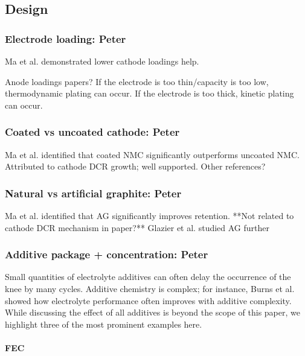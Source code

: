 \documentclass{article}
\begin{document}
\subsection{Design}

\subsubsection{Electrode loading: Peter}

Ma et al.\cite{ma_editors_2019} demonstrated lower cathode loadings help.

Anode loadings papers?
If the electrode is too thin/capacity is too low, thermodynamic plating can occur.
If the electrode is too thick, kinetic plating can occur.

\subsubsection{Coated vs uncoated cathode: Peter}

Ma et al.\cite{ma_editors_2019} identified that coated NMC significantly outperforms uncoated NMC.
Attributed to cathode DCR growth; well supported.
Other references?

\subsubsection{Natural vs artificial graphite: Peter}

Ma et al.\cite{ma_editors_2019} identified that AG significantly improves retention.
**Not related to cathode DCR mechanism in paper?**
Glazier et al. studied AG further

\subsubsection{Additive package + concentration: Peter}

Small quantities of electrolyte additives can often delay the occurrence of the knee by many cycles. Additive chemistry is complex; for instance, Burns et al.\cite{burns_predicting_2013} showed how electrolyte performance often improves with additive complexity. While discussing the effect of all additives is beyond the scope of this paper, we highlight three of the most prominent examples here.

\paragraph{FEC}
\end{document}
